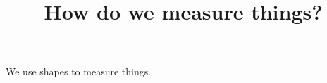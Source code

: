 \documentclass{ximera}
\title{How do we measure things?}
\begin{document}
\begin{abstract}
\end{abstract}
\maketitle

We use shapes to measure things.
\end{document}

